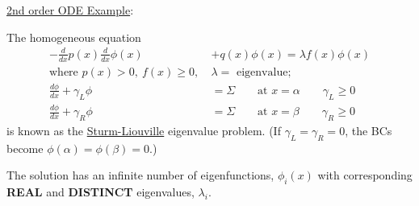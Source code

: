 \documentclass[12pt]{article}
\newcommand{\ve}[1]{\ensuremath{\mathbf{#1}}}
\newcommand{\Macro}{\ensuremath{\Sigma}}
\begin{document}
%

\vspace*{1em}
\underline{2nd order ODE Example}:

The homogeneous equation %
%
\begin{align}
-\frac{d}{dx}p(x) \frac{d}{dx}\phi(x) &+ q(x)\phi(x) = \lambda f(x) \phi(x) \nonumber \\
\text{where }p(x) > 0, \:f(x) \geq 0,\: &\lambda = \text{ eigenvalue;}\nonumber \\
\frac{d\phi}{dx} + \gamma_L \phi &= \Macro \qquad \text{at }x=\alpha \qquad \gamma_L \geq 0  \nonumber \\
\frac{d\phi}{dx} + \gamma_R \phi &= \Macro \qquad \text{at }x=\beta \qquad \gamma_R \geq 0\nonumber 
\end{align}
%
is known as the \underline{Sturm-Liouville} eigenvalue problem. (If $\gamma_L = \gamma_R = 0$, the BCs become $\phi(\alpha) = \phi(\beta) = 0$.)

The solution has an infinite number of eigenfunctions, $\phi_i(x)$ with corresponding \textbf{REAL} and \textbf{DISTINCT} eigenvalues, $\lambda_i$. 
\end{document}
